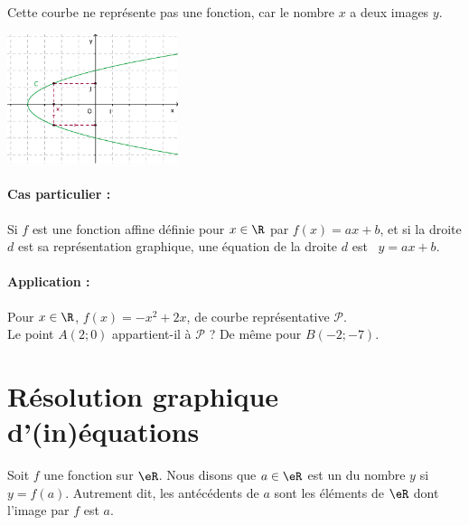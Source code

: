 \begin{rem}
  \begin{minipage}[t]{0.45\linewidth}
    Cette courbe ne représente pas une fonction, car le nombre $x$ a
    deux images $y$.    
  \end{minipage}
  \qquad
  \begin{minipage}[c]{0.4\linewidth}
    \includegraphics[width=5cm]{F_NonFct.pdf}
  \end{minipage}
\end{rem}


\paragraph{Cas particulier :} 
\begin{minipage}[t]{0.8\linewidth}
  Si $f$ est une fonction affine définie pour $x\in\R$ par 
  $f(x)=ax+b$, et si la droite $d$ est sa représentation graphique,
  une équation de la droite $d$ est \ $y=ax+b$.
\end{minipage}

\paragraph{Application :} 
\begin{minipage}[t]{0.8\linewidth}
  Pour $x\in\R$, $f(x)=-x^2+2x$, de courbe représentative
  $\mathscr{P}$.\\
  Le point $A(2;0)$ appartient-il à $\mathscr{P}$ ? De même pour
  $B(-2;-7)$.
  \vspace{4cm}
\end{minipage}

\section{Résolution graphique d'(in)équations} 

\begin{definition}
    Soit \( f\) une fonction sur \( \eR\). Nous disons que \( a\in \eR\) est un  du nombre \( y\) si \( y=f(a)\). Autrement dit, les antécédents de \( a\) sont les éléments de \( \eR\) dont l'image par \( f\) est \( a\).
\end{definition}


